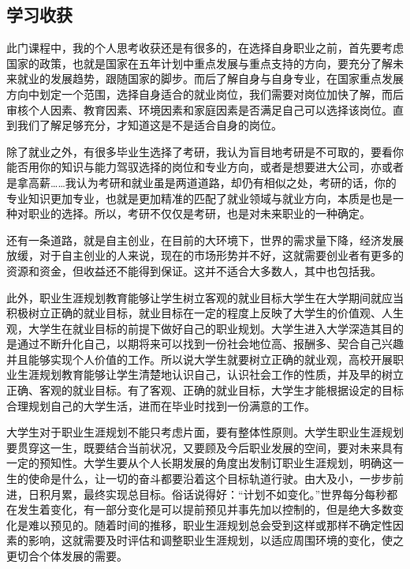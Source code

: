 \documentclass{ctexart}
\begin{document}
		\subsection{学习收获}
			此门课程中，我的个人思考收获还是有很多的，在选择自身职业之前，首先要考虑国家的政策，也就是国家在五年计划中重点发展与重点支持的方向，要充分了解未来就业的发展趋势，跟随国家的脚步。而后了解自身与自身专业，在国家重点发展方向中划定一个范围，选择自身适合的就业岗位，我们需要对岗位加快了解，而后审核个人因素、教育因素、环境因素和家庭因素是否满足自己可以选择该岗位。直到我们了解足够充分，才知道这是不是适合自身的岗位。\par
			除了就业之外，有很多毕业生选择了考研，我认为盲目地考研是不可取的，要看你能否用你的知识与能力驾驭选择的岗位和专业方向，或者是想要进大公司，亦或者是拿高薪……我认为考研和就业虽是两道道路，却仍有相似之处，考研的话，你的专业知识更加专业，也就是更加精准的匹配了就业领域与就业方向，本质是也是一种对职业的选择。所以，考研不仅仅是考研，也是对未来职业的一种确定。\par
			还有一条道路，就是自主创业，在目前的大环境下，世界的需求量下降，经济发展放缓，对于自主创业的人来说，现在的市场形势并不好，这就需要创业者有更多的资源和资金，但收益还不能得到保证。这并不适合大多数人，其中也包括我。\par
			此外，职业生涯规划教育能够让学生树立客观的就业目标大学生在大学期间就应当积极树立正确的就业目标，就业目标在一定的程度上反映了大学生的价值观、人生观，大学生在就业目标的前提下做好自己的职业规划。大学生进入大学深造其目的是通过不断升化自己，以期将来可以找到一份社会地位高、报酬多、契合自己兴趣并且能够实现个人价值的工作。所以说大学生就要树立正确的就业观，高校开展职业生涯规划教育能够让学生清楚地认识自己，认识社会工作的性质，并及早的树立正确、客观的就业目标。有了客观、正确的就业目标，大学生才能根据设定的目标合理规划自己的大学生活，进而在毕业时找到一份满意的工作。\par
			大学生对于职业生涯规划不能只考虑片面，要有整体性原则。大学生职业生涯规划要贯穿这一生，既要结合当前状况，又要顾及今后职业发展的空间，要对未来具有一定的预知性。大学生要从个人长期发展的角度出发制订职业生涯规划，明确这一生的使命是什么，让一切的奋斗都要沿着这个目标轨道行驶。由大及小，一步步前进，日积月累，最终实现总目标。俗话说得好：“计划不如变化。”世界每分每秒都在发生着变化，有一部分变化是可以提前预见并事先加以控制的，但是绝大多数变化是难以预见的。随着时间的推移，职业生涯规划总会受到这样或那样不确定性因素的影响，这就需要及时评估和调整职业生涯规划，以适应周围环境的变化，使之更切合个体发展的需要。\par
	
	\newpage
	
\end{document}
